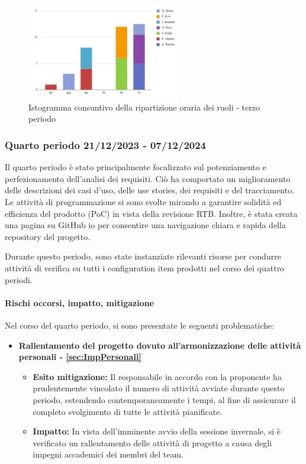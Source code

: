 \begin{figure}[H]
    \centering
    \includegraphics[width=0.6\textwidth]{../Images/consuntivoDivisioneRuoli3Periodo.png}
    \caption{Istogramma consuntivo della ripartizione oraria dei ruoli - terzo periodo}
    \label{fig:Consuntivo_ripartizione_oraria_3}
\end{figure}




\subsubsection{Quarto periodo  21/12/2023 - 07/12/2024}

Il quarto periodo è stato principalmente focalizzato sul potenziamento e perfezionamento dell'analisi dei requisiti. Ciò ha comportato un miglioramento delle descrizioni dei casi d'uso, delle use stories, dei requisiti e del tracciamento. Le attività di programmazione si sono svolte mirando a garantire solidità ed efficienza del prodotto (PoC) in vista della revisione RTB. Inoltre, è stata creata una pagina su GitHub io per consentire una navigazione chiara e rapida della repository del progetto.

Durante questo periodo, sono state instanziate rilevanti risorse per condurre attività di verifica su tutti i configuration item prodotti nel corso dei quattro periodi.

\paragraph{Rischi occorsi, impatto, mitigazione} 
Nel corso del quarto periodo, si sono presentate le seguenti problematiche:
\begin{itemize}
    \item \textbf{Rallentamento del progetto dovuto all’armonizzazione delle attività personali - \ref{sec:ImpPersonali}}
    \begin{itemize}
        \item \textbf{Esito mitigazione:} 
        Il responsabile in accordo con la proponente ha prudentemente vincolato il numero di attività avviate durante questo periodo, estendendo contemporaneamente i tempi, al fine di assicurare il completo svolgimento di tutte le attività pianificate.
        \item \textbf{Impatto:}
        In vista dell'imminente avvio della sessione invernale, si è verificato un rallentamento delle attività di progetto a causa degli impegni accademici dei membri del team.
        \end{itemize}
\end{itemize}

